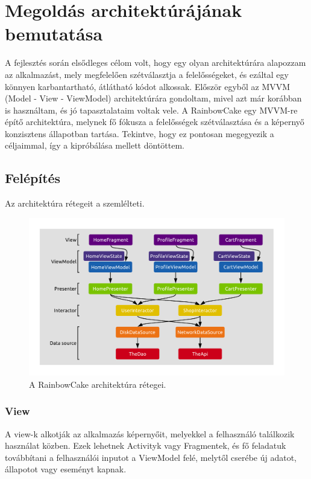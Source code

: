 \chapter{Megoldás architektúrájának bemutatása}

A fejlesztés során elsődleges célom volt, hogy egy olyan architektúrára alapozzam az alkalmazást, mely megfelelően szétválasztja a felelősségeket, és ezáltal egy könnyen karbantartható, átlátható kódot alkossak. Először egyből az MVVM (Model - View - ViewModel) architektúrára gondoltam, mivel azt már korábban is használtam, és jó tapasztalataim voltak vele. A RainbowCake\cite{Rainbowcake} egy MVVM-re építő architektúra, melynek fő fókusza a felelősségek szétválasztása és a képernyő konzisztens állapotban tartása. Tekintve, hogy ez pontosan megegyezik a céljaimmal, így a kipróbálása mellett döntöttem.

\section{Felépítés}

Az architektúra rétegeit a  szemlélteti.

\begin{figure}[!ht]
	\centering
	\includegraphics[width=150mm, keepaspectratio]{figures/final-architecture.png}
	\caption{A RainbowCake architektúra rétegei. \cite{Rainbowcake}}
	\label{fig:RainbowCakeLayers}
\end{figure}

\subsection{View}
A view-k alkotják az alkalmazás képernyőit, melyekkel a felhasználó találkozik használat közben. Ezek lehetnek Activityk vagy Fragmentek, és fő feladatuk továbbítani a felhasználói inputot a ViewModel felé, melytől cserébe új adatot, állapotot vagy eseményt kapnak. 

